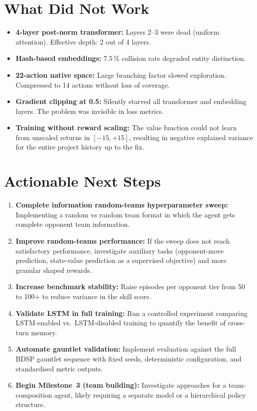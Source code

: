 \section{What Did Not Work}

\begin{itemize}
  \item \textbf{4-layer post-norm transformer:} Layers 2--3 were dead (uniform
        attention).  Effective depth: 2 out of 4 layers.
  \item \textbf{Hash-based embeddings:} 7.5\,\% collision rate degraded entity
        distinction.
  \item \textbf{22-action native space:} Large branching factor slowed
        exploration.  Compressed to 14 actions without loss of coverage.
  \item \textbf{Gradient clipping at 0.5:} Silently starved all transformer
        and embedding layers.  The problem was invisible in loss metrics.
  \item \textbf{Training without reward scaling:} The value function could not
        learn from unscaled returns in $[-15,+15]$, resulting in negative
        explained variance for the entire project history up to the fix.
\end{itemize}

\section{Actionable Next Steps}

\begin{enumerate}
  \item \textbf{Complete information random-teams hyperparameter sweep:} Implementing a random vs random team format in which the agent gets complete opponent team information.
  \item \textbf{Improve random-teams performance:} If the sweep does not reach
        satisfactory performance, investigate auxiliary tasks (opponent-move
        prediction, state-value prediction as a supervised objective) and
        more granular shaped rewards.

  \item \textbf{Increase benchmark stability:} Raise episodes per opponent
        tier from 50 to 100+ to reduce variance in the skill score.

  \item \textbf{Validate LSTM in full training:} Run a controlled experiment
        comparing LSTM-enabled vs.\ LSTM-disabled training to quantify the
        benefit of cross-turn memory.

  \item \textbf{Automate gauntlet validation:} Implement evaluation against
        the full BDSP gauntlet sequence with fixed seeds, deterministic
        configuration, and standardised metric outputs.

  \item \textbf{Begin Milestone~3 (team building):} Investigate approaches
        for a team-composition agent, likely requiring a separate model or a
        hierarchical policy structure.
\end{enumerate}

